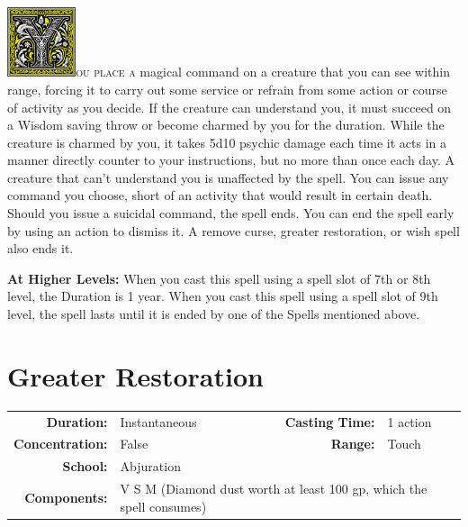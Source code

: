 \documentclass[12pt,showtrims]{memoir}
\begin{document}
\vspace{1\baselineskip}\noindent
\lettrine[lines=4]{\includegraphics[height=58pt]{initials/Y.png}}{ou place a}
magical command on a creature that you can see within range, forcing it to
carry out some service or refrain from some action or course of activity as you
decide. If the creature can understand you, it must succeed on a Wisdom saving
throw or become charmed by you for the duration. While the creature is charmed
by you, it takes 5d10 psychic damage each time it acts in a manner directly
counter to your instructions, but no more than once each day. A creature that
can’t understand you is unaffected by the spell. You can issue any command you
choose, short of an activity that would result in certain death. Should you
issue a suicidal command, the spell ends. You can end the spell early by using
an action to dismiss it. A remove curse, greater restoration, or wish spell
also ends it.

\vspace{8pt} \noindent\textbf{At Higher Levels:} When you cast this spell using
a spell slot of 7th or 8th level, the Duration is 1 year. When you cast this
spell using a spell slot of 9th level, the spell lasts until it is ended by one
of the Spells mentioned above.

\newpage
\section*{Greater Restoration}
{
\small\centering\vspace{-6pt}
\begin{tabular}{rlrl}
\toprule

\textbf{Duration:} & Instantaneous &
\textbf{Casting Time:} & 1 action \\
\textbf{Concentration:} & False &
\textbf{Range:} & Touch \\
\textbf{School:} & Abjuration \\
\textbf{Components:} & \multicolumn{3}{p{0.7\textwidth}}{V S M (Diamond dust worth at least 100 gp, which the spell consumes)}\\

\bottomrule
\end{tabular}
}
\end{document}
